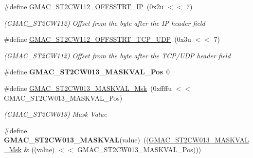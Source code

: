 \begin{DoxyCompactItemize}
\mbox{\label{group__SAMV71__GMAC_ga9dc70463c49d5b2a196757a4b5e48294}} 
\#define \mbox{\hyperlink{group__SAMV71__GMAC_ga9dc70463c49d5b2a196757a4b5e48294}{G\+M\+A\+C\+\_\+\+S\+T2\+C\+W112\+\_\+\+O\+F\+F\+S\+S\+T\+R\+T\+\_\+\+IP}}~(0x2u $<$$<$ 7)
\begin{DoxyCompactList}\small\item\em (G\+M\+A\+C\+\_\+\+S\+T2\+C\+W112) Offset from the byte after the IP header field \end{DoxyCompactList}\item 
\mbox{\label{group__SAMV71__GMAC_ga396ef35ffbd3075fbbcd5d6073558b96}} 
\#define \mbox{\hyperlink{group__SAMV71__GMAC_ga396ef35ffbd3075fbbcd5d6073558b96}{G\+M\+A\+C\+\_\+\+S\+T2\+C\+W112\+\_\+\+O\+F\+F\+S\+S\+T\+R\+T\+\_\+\+T\+C\+P\+\_\+\+U\+DP}}~(0x3u $<$$<$ 7)
\begin{DoxyCompactList}\small\item\em (G\+M\+A\+C\+\_\+\+S\+T2\+C\+W112) Offset from the byte after the T\+C\+P/\+U\+DP header field \end{DoxyCompactList}\item 
\mbox{\label{group__SAMV71__GMAC_ga353c35499945a9b71913f1066b8cab80}} 
\#define {\bfseries G\+M\+A\+C\+\_\+\+S\+T2\+C\+W013\+\_\+\+M\+A\+S\+K\+V\+A\+L\+\_\+\+Pos}~0
\item 
\mbox{\label{group__SAMV71__GMAC_ga12b1ec8e33abdcf08c575e6e363e10c1}} 
\#define \mbox{\hyperlink{group__SAMV71__GMAC_ga12b1ec8e33abdcf08c575e6e363e10c1}{G\+M\+A\+C\+\_\+\+S\+T2\+C\+W013\+\_\+\+M\+A\+S\+K\+V\+A\+L\+\_\+\+Msk}}~(0xffffu $<$$<$ G\+M\+A\+C\+\_\+\+S\+T2\+C\+W013\+\_\+\+M\+A\+S\+K\+V\+A\+L\+\_\+\+Pos)
\begin{DoxyCompactList}\small\item\em (G\+M\+A\+C\+\_\+\+S\+T2\+C\+W013) Mask Value \end{DoxyCompactList}\item 
\mbox{\label{group__SAMV71__GMAC_gaa795a02cb6a39c03bd77b0c7caf22f8b}} 
\#define {\bfseries G\+M\+A\+C\+\_\+\+S\+T2\+C\+W013\+\_\+\+M\+A\+S\+K\+V\+AL}(value)~((\mbox{\hyperlink{group__SAMV71__GMAC_ga12b1ec8e33abdcf08c575e6e363e10c1}{G\+M\+A\+C\+\_\+\+S\+T2\+C\+W013\+\_\+\+M\+A\+S\+K\+V\+A\+L\+\_\+\+Msk}} \& ((value) $<$$<$ G\+M\+A\+C\+\_\+\+S\+T2\+C\+W013\+\_\+\+M\+A\+S\+K\+V\+A\+L\+\_\+\+Pos)))

\end{DoxyCompactItemize}
